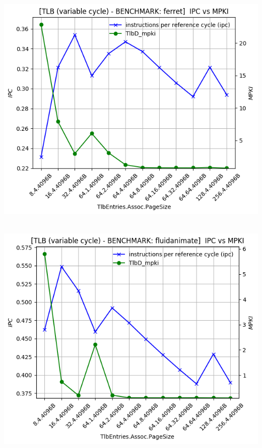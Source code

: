 \begin{minipage}{\textwidth}
    \begin{center}
        \\
        \vspace{3mm}
        \includegraphics[scale=0.65]{graphs/TLB/var/ferret.png}
        \vspace{6mm}
    \end{center}
\end{minipage}


\begin{minipage}{\textwidth}
    \begin{center}
        \\
        \vspace{3mm}
        \includegraphics[scale=0.65]{graphs/TLB/var/fluidanimate.png}
        \vspace{6mm}
    \end{center}
\end{minipage}


